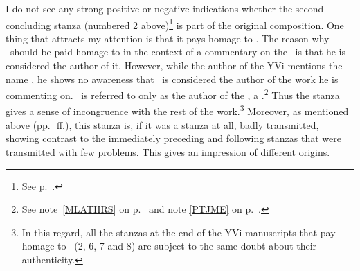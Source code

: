 I do not see any strong positive or negative indications whether the second concluding stanza (numbered 2 above)\footnote{See p.~\pageref{patanjaliverseone}.} is part of the original composition. One thing that attracts my attention is that it pays homage to \Patanjali. The reason why \Patanjali\ should be paid homage to in the context of a commentary on the \PYS\ is that he is considered the author of it. However, while the author of the YVi mentions the name \Patanjali, he shows no awareness that \Patanjali\ is considered the author of the work he is commenting on. \Patanjali\ is referred to only as the author of the \VMBh, a .\footnote{See note~\ref{MLATHRS} on p.~\pageref{MLATHRS} and note \ref{PTJME} on p.~\pageref{PTJME}.} Thus the stanza gives a sense of incongruence with the rest of the work.\footnote{In this regard, all the stanzas at the end of the YVi manuscripts that pay homage to \Patanjali\ (2, 6, 7 and 8) are subject to the same doubt about their authenticity.} Moreover, as mentioned above (pp.~\pageref{patanjaliverseone}\,ff.), this stanza is, if it was a stanza at all, badly transmitted, showing contrast to the immediately preceding and following stanzas that were transmitted with few problems. This gives an impression of different origins. %



